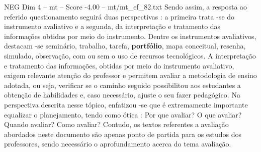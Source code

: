 \begin{textsample}{NEG Dim 4 – mt – Score -4.00 – mt/mt\_ef\_82.txt}
Sendo assim, a resposta ao referido questionamento seguirá duas perspectivas : a primeira trata -se do instrumento avaliativo e a segunda, da interpretação e tratamento das informações obtidas por meio do instrumento.
Dentre os instrumentos avaliativos, destacam -se seminário, trabalho, tarefa, \textbf{portfólio}, mapa conceitual, resenha, simulado, observação, com ou sem o uso de recursos tecnológicos.
A interpretação e tratamento das informações, obtidas por meio do instrumento avaliativo, exigem relevante atenção do professor e permitem avaliar a metodologia de ensino adotada, ou seja, verificar se o caminho seguido possibilitou aos estudantes a obtenção de habilidades e, caso necessário, ajuste o seu fazer pedagógico.
Na perspectiva descrita nesse tópico, enfatizou -se que é extremamente importante equalizar o planejamento, tendo como ótica : Por que avaliar?
O que avaliar?
Quando avaliar?
Como avaliar?
Contudo, os textos referentes a avaliação abordados neste documento são apenas ponto de partida para os estudos dos professores, sendo necessário o aprofundamento acerca do tema avaliação.

\end{textsample}
